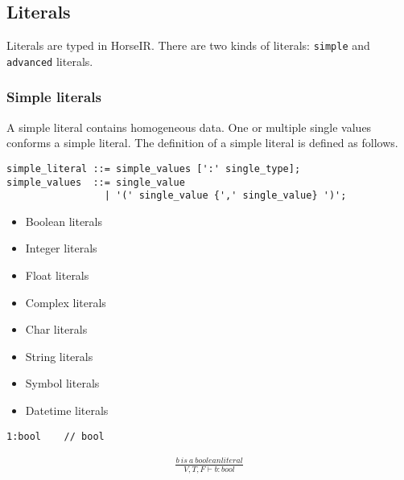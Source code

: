 
\subsection{Literals}

Literals are typed in HorseIR.  There are two kinds of literals: \texttt{simple} and \texttt{advanced} literals.

\subsubsection{Simple literals}

A simple literal contains homogeneous data.  One or multiple single values conforms a simple literal.  The definition of a simple literal is defined as follows.

\begin{verbatim}
simple_literal ::= simple_values [':' single_type];
simple_values  ::= single_value
                 | '(' single_value {',' single_value} ')';
\end{verbatim}



\begin{itemize}[noitemsep]
\item Boolean literals
\item Integer literals
\item Float literals
\item Complex literals
\item Char literals
\item String literals
\item Symbol literals
\item Datetime literals
\end{itemize}


\begin{verbatim}
1:bool    // bool
\end{verbatim}


\begin{align*}
\frac{b\ is\ a\ boolean literal}{V,T,F\vdash b:bool}
\end{align*}


